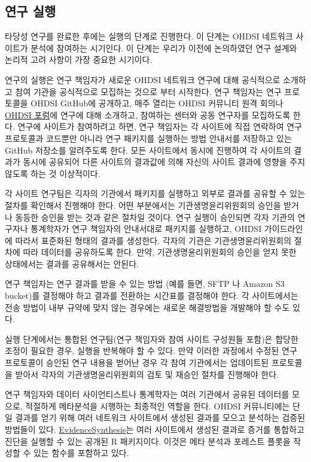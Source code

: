 \documentclass[11pt]{book}
\theoremstyle{definition}
\theoremstyle{definition}
\theoremstyle{definition}
\theoremstyle{remark}
\begin{document}
\subsection{연구 실행}\label{-}

타당성 연구를 완료한 후에는 실행의 단계로 진행한다. 이 단계는 OHDSI
네트워크 사이트가 분석에 참여하는 시기인다. 이 단계는 우리가 이전에
논의하였던 연구 설계와 논리적 고려 사항이 가장 중요한 시기이다.

연구의 실행은 연구 책임자가 새로운 OHDSI 네트워크 연구에 대해 공식적으로
소개하고 참여 기관을 공식적으로 모집하는 것으로 부터 시작한다. 연구
책임자는 연구 프로토콜을 OHDSI GitHub에 공개하고, 매주 열리는 OHDSI
커뮤니티 원격 회의나 \href{http://forums.ohdsi.org}{OHDSI 포럼}에 연구에
대해 소개하고, 참여하는 센터와 공동 연구자를 모집하도록 한다. 연구에
사이트가 참여하려고 하면, 연구 책임자는 각 사이트에 직접 연락하여 연구
프로토콜과 코드뿐만 아니라 연구 패키지를 실행하는 방법 안내서를 저장하고
있는 GitHub 저장소를 알려주도록 한다. 모든 사이트에서 동시에 진행하여 각
사이트의 결과가 동시에 공유되어 다른 사이트의 결과값에 의해 자신의
사이트 결과에 영향을 주지 않도록 하는 것 이상적이다.

각 사이트 연구팀은 긱자의 기관에서 패키지를 실행하고 외부로 결과를
공유할 수 있는 절차를 확인해서 진행해야 한다. 어떤 부분에서는
기관생명윤리위원회의 승인을 받거나 동등한 승인을 받는 것과 같은 절차일
것이다. 연구 실행이 승인되면 각자 기관의 연구자나 통계학자가 연구
책임자의 안내서대로 패키지를 실행하고, OHDSI 가이드라인에 따라서
표준화된 형태의 결과를 생성한다. 각자의 기관은 기관생명윤리위원회의
절차에 따라 데이터를 공유하도록 한다. 만약, 기관생명윤리위원회의 승인을
얻지 못한 상태에서는 결과를 공유해서는 안된다.

연구 책임자는 연구 결과를 받을 수 있는 방법 (예를 들면, SFTP 나 Amazon
S3 bucket)를 결정해야 하고 결과를 전환하는 시간표를 결정해야 한다. 각
사이트에서는 전송 방법이 내부 규약에 맞지 않는 경우에는 새로운
해결방법을 개발해야 할 수도 있다.

실행 단계에서는 통합된 연구팀(연구 책임자와 참여 사이트 구성원들 포함)은
합당한 조정이 필요한 경우, 실행을 반복해야 할 수 있다. 만약 이러한
과정에서 수정된 연구 프로토콜이 승인된 연구 내용을 벋어난 경우 각 참여
기관에서는 업데이트된 프로토콜을 받아서 각자의 기관생명윤리위원회의 검토
및 재승인 절차를 진행해야 한다.

연구 책임자와 데이터 사이언티스트나 통계학자는 여러 기관에서 공유된
데이터를 모으로, 적절하게 메타분석을 시행하는 최종적인 역할을 한다.
OHDSI 커뮤니티에는 단일 결과를 얻기 위해 여러 네트워크 사이트에서 생성된
결과를 모으고 분석하는 검증된 방법들이 있다.
\href{https://github.com/OHDSI/EvidenceSynthesis}{EvidenceSynthesis}는
여러 사이트에서 생성된 결과로 증거를 통합하고 진단을 실행할 수 있는
공개된 R 패키지이다. 이것은 메타 분석과 포레스트 플롯을 작성할 수 있는
함수를 포함하고 있다.
\end{document}
